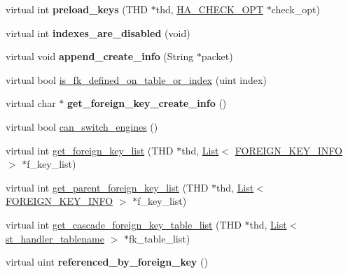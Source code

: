 \begin{DoxyCompactItemize}
virtual int {\bfseries preload\+\_\+keys} (T\+HD $\ast$thd, \mbox{\hyperlink{structst__ha__check__opt}{H\+A\+\_\+\+C\+H\+E\+C\+K\+\_\+\+O\+PT}} $\ast$check\+\_\+opt)
\item 
\mbox{\label{classhandler_a8bc45e93a1b669fa750f73a617c46bac}} 
virtual int {\bfseries indexes\+\_\+are\+\_\+disabled} (void)
\item 
\mbox{\label{classhandler_a441afeebcb5b56e598fb7f860c9247d1}} 
virtual void {\bfseries append\+\_\+create\+\_\+info} (String $\ast$packet)
\item 
virtual bool \mbox{\hyperlink{classhandler_adda33331aacc500b1b974033cb64a869}{is\+\_\+fk\+\_\+defined\+\_\+on\+\_\+table\+\_\+or\+\_\+index}} (uint index)
\item 
\mbox{\label{classhandler_a8712abc71df0d89559e2861c100a8e3e}} 
virtual char $\ast$ {\bfseries get\+\_\+foreign\+\_\+key\+\_\+create\+\_\+info} ()
\item 
virtual bool \mbox{\hyperlink{classhandler_a6baab93a22543b707e6e59b9d59810d2}{can\+\_\+switch\+\_\+engines}} ()
\item 
virtual int \mbox{\hyperlink{classhandler_a81064e61d4c08261af409fb6ee34e3ca}{get\+\_\+foreign\+\_\+key\+\_\+list}} (T\+HD $\ast$thd, \mbox{\hyperlink{classList}{List}}$<$ \mbox{\hyperlink{structst__foreign__key__info}{F\+O\+R\+E\+I\+G\+N\+\_\+\+K\+E\+Y\+\_\+\+I\+N\+FO}} $>$ $\ast$f\+\_\+key\+\_\+list)
\item 
virtual int \mbox{\hyperlink{classhandler_a9187eea9999eba802ee4ae01f91dda3b}{get\+\_\+parent\+\_\+foreign\+\_\+key\+\_\+list}} (T\+HD $\ast$thd, \mbox{\hyperlink{classList}{List}}$<$ \mbox{\hyperlink{structst__foreign__key__info}{F\+O\+R\+E\+I\+G\+N\+\_\+\+K\+E\+Y\+\_\+\+I\+N\+FO}} $>$ $\ast$f\+\_\+key\+\_\+list)
\item 
virtual int \mbox{\hyperlink{classhandler_a683eef70b4481c3bc0b10336e179de27}{get\+\_\+cascade\+\_\+foreign\+\_\+key\+\_\+table\+\_\+list}} (T\+HD $\ast$thd, \mbox{\hyperlink{classList}{List}}$<$ \mbox{\hyperlink{structst__handler__tablename}{st\+\_\+handler\+\_\+tablename}} $>$ $\ast$fk\+\_\+table\+\_\+list)
\item 
\mbox{\label{classhandler_a28b038c18aeb8114376725e6f8d39871}} 
virtual uint {\bfseries referenced\+\_\+by\+\_\+foreign\+\_\+key} ()
\item 

\end{DoxyCompactItemize}
